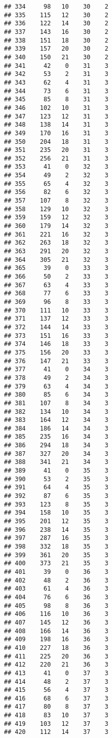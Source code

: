 \documentclass[
]{article}
\begin{document}
\begin{verbatim}
## 334     98   10    30    2
## 335    115   12    30    2
## 336    122   14    30    2
## 337    143   16    30    2
## 338    151   18    30    2
## 339    157   20    30    2
## 340    150   21    30    2
## 341     42    0    31    3
## 342     53    2    31    3
## 343     62    4    31    3
## 344     73    6    31    3
## 345     85    8    31    3
## 346    102   10    31    3
## 347    123   12    31    3
## 348    138   14    31    3
## 349    170   16    31    3
## 350    204   18    31    3
## 351    235   20    31    3
## 352    256   21    31    3
## 353     41    0    32    3
## 354     49    2    32    3
## 355     65    4    32    3
## 356     82    6    32    3
## 357    107    8    32    3
## 358    129   10    32    3
## 359    159   12    32    3
## 360    179   14    32    3
## 361    221   16    32    3
## 362    263   18    32    3
## 363    291   20    32    3
## 364    305   21    32    3
## 365     39    0    33    3
## 366     50    2    33    3
## 367     63    4    33    3
## 368     77    6    33    3
## 369     96    8    33    3
## 370    111   10    33    3
## 371    137   12    33    3
## 372    144   14    33    3
## 373    151   16    33    3
## 374    146   18    33    3
## 375    156   20    33    3
## 376    147   21    33    3
## 377     41    0    34    3
## 378     49    2    34    3
## 379     63    4    34    3
## 380     85    6    34    3
## 381    107    8    34    3
## 382    134   10    34    3
## 383    164   12    34    3
## 384    186   14    34    3
## 385    235   16    34    3
## 386    294   18    34    3
## 387    327   20    34    3
## 388    341   21    34    3
## 389     41    0    35    3
## 390     53    2    35    3
## 391     64    4    35    3
## 392     87    6    35    3
## 393    123    8    35    3
## 394    158   10    35    3
## 395    201   12    35    3
## 396    238   14    35    3
## 397    287   16    35    3
## 398    332   18    35    3
## 399    361   20    35    3
## 400    373   21    35    3
## 401     39    0    36    3
## 402     48    2    36    3
## 403     61    4    36    3
## 404     76    6    36    3
## 405     98    8    36    3
## 406    116   10    36    3
## 407    145   12    36    3
## 408    166   14    36    3
## 409    198   16    36    3
## 410    227   18    36    3
## 411    225   20    36    3
## 412    220   21    36    3
## 413     41    0    37    3
## 414     48    2    37    3
## 415     56    4    37    3
## 416     68    6    37    3
## 417     80    8    37    3
## 418     83   10    37    3
## 419    103   12    37    3
## 420    112   14    37    3

\end{verbatim}
\end{document}
